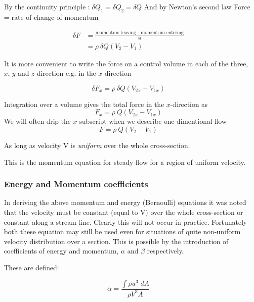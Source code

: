 \documentclass[a4paper, 12pt, british]{article} %
\numberwithin{equation}{section}
\numberwithin{figure}{section}
\numberwithin{table}{section}
\begin{document}
By the continuity principle : $\delta Q_1 = \delta Q_2 = \delta Q$
And by Newton's second law Force = rate of change of momentum

 \begin{align}
\delta F &= \frac{\text{momentum leaving - momentum entering}}{\delta t} \nonumber\\ 
 &= \rho \: \delta Q(V_2 - V_1)
\end{align}
 

It is more convenient to write the force on a control volume in each of the three, $x$, $y$ and $z$ direction e.g. in the $x$-direction

  \begin{equation}
 \delta F_x = \rho \: \delta Q(V_{2x} - V_{1x})
 \end{equation}




Integration over a volume gives the total force in the $x$-direction as 
\begin{equation}
F_x = \rho \:  Q(V_{2x} - V_{1x})
\end{equation}
We will often drip the $x$ subscript when we describe one-dimentional flow
\begin{equation*}
F = \rho \:  Q(V_{2} - V_{1})
\end{equation*}

As long as velocity V is \textit{uniform}  over the whole cross-section. 

This is the momentum equation for steady flow for a region of uniform velocity.

\subsubsection{Energy and Momentum coefficients}

In deriving the above momentum and energy (Bernoulli) equations it was noted that the velocity must be constant (equal to V) over the whole cross-section or constant along a stream-line. Clearly this will not occur in practice.  Fortunately both these equation may still be used even for situations of quite non-uniform velocity distribution over a section. This is possible by the introduction of coefficients of energy and momentum, $\alpha$ and $\beta$ respectively.

These are defined:

\begin{equation}
\alpha = \frac{\int \rho u^3 \; dA}{\rho V^3 A}
\label{eq:alpha}
\end{equation} 
\end{document}
